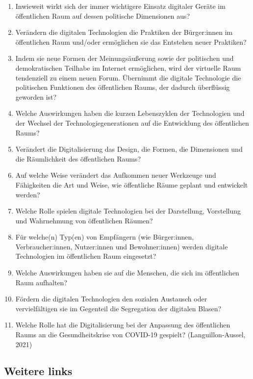 \documentclass[
]{book}
\providecommand{\tightlist}{%
  \setlength{\itemsep}{0pt}\setlength{\parskip}{0pt}}
\begin{document}
\begin{enumerate}
\def\labelenumi{\arabic{enumi}.}
\tightlist
\item
  Inwieweit wirkt sich der immer wichtigere Einsatz digitaler Geräte im öffentlichen Raum auf dessen politische Dimensionen aus?
\item
  Verändern die digitalen Technologien die Praktiken der Bürger:innen im öffentlichen Raum und/oder ermöglichen sie das Entstehen neuer Praktiken?
\item
  Indem sie neue Formen der Meinungsäußerung sowie der politischen und demokratischen Teilhabe im Internet ermöglichen, wird der virtuelle Raum tendenziell zu einem neuen Forum. Übernimmt die digitale Technologie die politischen Funktionen des öffentlichen Raums, der dadurch überflüssig geworden ist?
\item
  Welche Auswirkungen haben die kurzen Lebenszyklen der Technologien und der Wechsel der Technologiegenerationen auf die Entwicklung des öffentlichen Raums?
\item
  Verändert die Digitalisierung das Design, die Formen, die Dimensionen und die Räumlichkeit des öffentlichen Raums?
\item
  Auf welche Weise verändert das Aufkommen neuer Werkzeuge und Fähigkeiten die Art und Weise, wie öffentliche Räume geplant und entwickelt werden?
\item
  Welche Rolle spielen digitale Technologien bei der Darstellung, Vorstellung und Wahrnehmung von öffentlichen Räumen?
\item
  Für welche(n) Typ(en) von Empfängern (wie Bürger:innen, Verbraucher:innen, Nutzer:innen und Bewohner:innen) werden digitale Technologien im öffentlichen Raum eingesetzt?
\item
  Welche Auswirkungen haben sie auf die Menschen, die sich im öffentlichen Raum aufhalten?
\item
  Fördern die digitalen Technologien den sozialen Austausch oder vervielfältigen sie im Gegenteil die Segregation der digitalen Blasen?
\item
  Welche Rolle hat die Digitalisierung bei der Anpassung des öffentlichen Raums an die Gesundheitskrise von COVID-19 gespielt? (Languillon-Aussel, 2021)
\end{enumerate}

\hypertarget{weitere-links-4}{%
\subsection*{Weitere links}\label{weitere-links-4}}
\end{document}
